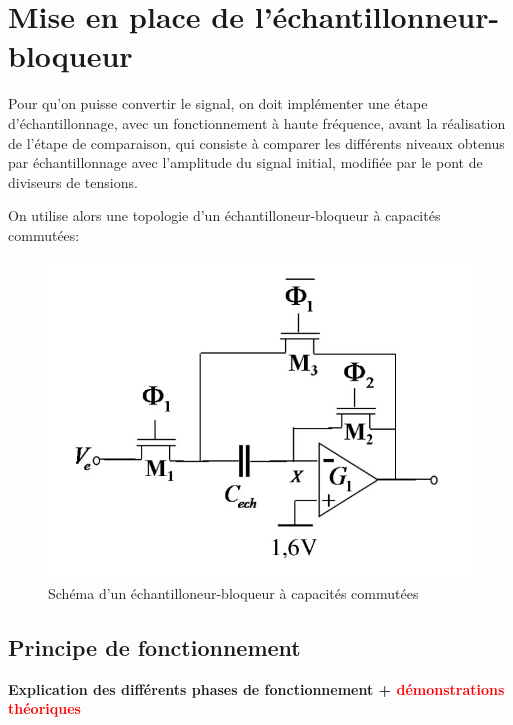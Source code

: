 \documentclass[11pt]{article}
\begin{document}
\clearpage

\section{Mise en place de l'\'echantillonneur-bloqueur}
Pour qu'on puisse convertir le signal, on doit impl\'ementer une \'etape d'\'echantillonnage, avec un fonctionnement \`a haute fr\'equence,
 avant la r\'ealisation de l'\'etape de comparaison, qui consiste \`a comparer les diff\'erents niveaux obtenus par \'echantillonnage avec l'amplitude du signal initial,
  modifi\'ee par le pont de diviseurs de tensions.

On utilise alors une topologie d'un \'echantilloneur-bloqueur \`a capacit\'es commut\'ees:

\begin{figure}[!htb]
\begin{center}
  \includegraphics[scale=0.30]{Echantillonneur-bloqueur.jpg}
  \caption{Sch\'ema d'un \'echantilloneur-bloqueur \`a capacit\'es commut\'ees}
\end{center}
\end{figure}

\subsection{Principe de fonctionnement}

\begin{center}
    \textbf{Explication des diff\'erents phases de fonctionnement + \textcolor{red}{d\'emonstrations th\'eoriques}}
\end{center}
\end{document}
